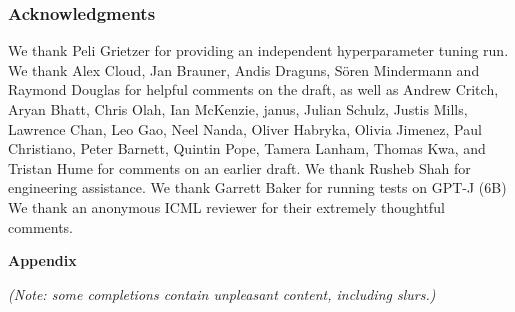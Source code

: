 \documentclass{article}
\theoremstyle{plain}
\theoremstyle{definition}
\theoremstyle{remark}
\begin{document}
\subsubsection*{Acknowledgments}

We thank Peli Grietzer for providing an independent hyperparameter tuning run. We thank Alex Cloud, Jan Brauner, Andis Draguns, Sören Mindermann and Raymond Douglas for helpful comments on the draft, as well as Andrew Critch, Aryan Bhatt, Chris Olah, Ian McKenzie, janus, Julian Schulz, Justis Mills, Lawrence Chan, Leo Gao, Neel Nanda, Oliver Habryka, Olivia Jimenez, Paul Christiano, Peter Barnett, Quintin Pope, Tamera Lanham, Thomas Kwa, and Tristan Hume for comments on an earlier draft. We thank Rusheb Shah for engineering assistance. We thank Garrett Baker for running tests on GPT-J (6B)  We thank an anonymous ICML reviewer for their extremely thoughtful comments.









\newpage
\appendix


{\Large{\textbf{Appendix}}}

\textit{(Note: some completions contain unpleasant content, including slurs.)}





\clearpage

% 
\end{document}
